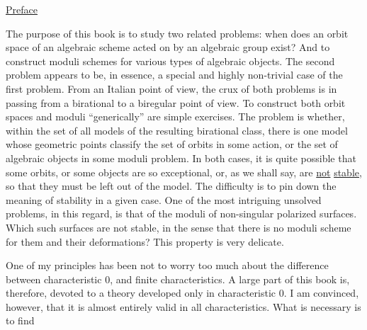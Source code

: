 \begin{center}\uline{Preface}\end{center}

The purpose of this book is to study two related problems: when does an orbit space of an algebraic scheme acted on by an algebraic group exist? And to construct moduli schemes for various types of algebraic objects. The second problem appears to be, in essence, a special and highly non-trivial case of the first problem. From an Italian point of view, the crux of both problems is in passing from a birational to a biregular point of view. To construct both orbit spaces and moduli ``generically'' are simple exercises. The problem is whether, within the set of all models of the resulting birational class, there is one model whose geometric points classify the set of orbits in some action, or the set of algebraic objects in some moduli problem. In both cases, it is quite possible that some orbits, or some objects are so exceptional, or, as we shall say, are \uline{not} \uline{stable}, so that they must be left out of the model. The difficulty is to pin down the meaning of stability in a given case. One of the most intriguing unsolved problems, in this regard, is that of the moduli of non-singular polarized surfaces. Which such surfaces are not stable, in the sense that there is no moduli scheme for them and their deformations? This property is very delicate.

One of my principles has been not to worry too much about the difference between characteristic $0$, and finite characteristics. A large part of this book is, therefore, devoted to a theory developed only in characteristic $0$. I am convinced, however, that it is almost entirely valid in all characteristics. What is necessary is to find

